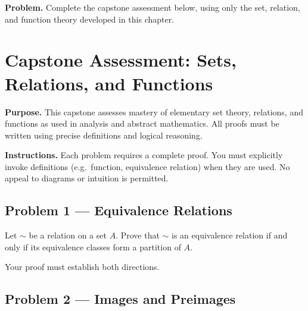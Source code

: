 \newpage
{}
\label{cap:sets-relations-functions}

\begin{tcolorbox}[
  colback=gray!6,
  colframe=gray!40,
  arc=2pt,
  left=8pt, right=8pt, top=6pt, bottom=6pt,
  title={\small\textbf{Capstone Problem}},
  fonttitle=\small\bfseries
]
\textbf{Problem.}
Complete the capstone assessment below, using only the set, relation, and
function theory developed in this chapter.
\end{tcolorbox}


\section{Capstone Assessment: Sets, Relations, and Functions}

\noindent
\textbf{Purpose.}
This capstone assesses mastery of elementary set theory,
relations, and functions as used in analysis and abstract mathematics.
All proofs must be written using precise definitions and logical reasoning.

\vspace{1em}

\noindent
\textbf{Instructions.}
Each problem requires a complete proof.
You must explicitly invoke definitions (e.g.\ function, equivalence relation)
when they are used.
No appeal to diagrams or intuition is permitted.

\vspace{1.5em}

\subsection*{Problem 1 — Equivalence Relations}

Let $\sim$ be a relation on a set $A$.
Prove that $\sim$ is an equivalence relation if and only if
its equivalence classes form a partition of $A$.

Your proof must establish both directions.

\vspace{1.5em}

\subsection*{Problem 2 — Images and Preimages}

